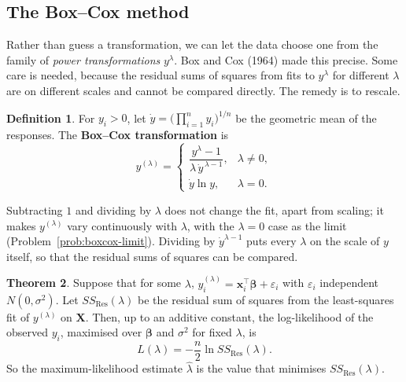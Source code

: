 \documentclass[11pt,a4paper]{article}
\numberwithin{equation}{section}
\theoremstyle{definition}
\newtheorem{thm}{Theorem}[subsection]
\newtheorem{defn}[thm]{Definition}
\begin{document}
\subsection{The Box--Cox method}
Rather than guess a transformation, we can let the data choose one from the family of
\emph{power transformations} $y^\lambda$. Box and Cox (1964) made this precise. Some care is
needed, because the residual sums of squares from fits to $y^\lambda$ for different $\lambda$ are
on different scales and cannot be compared directly. The remedy is to rescale.

\begin{defn}
For $y_i > 0$, let $\dot y = \bigl(\prod_{i=1}^n y_i\bigr)^{1/n}$ be the geometric mean of the
responses. The \textbf{Box--Cox transformation} is
\[
y^{(\lambda)} = \begin{cases}
\dfrac{y^\lambda - 1}{\lambda\,\dot y^{\,\lambda - 1}} , & \lambda \neq 0, \\[3mm]
\dot y\ln y , & \lambda = 0 .
\end{cases}
\]
\end{defn}

Subtracting $1$ and dividing by $\lambda$ does not change the fit, apart from scaling; it makes
$y^{(\lambda)}$ vary continuously with $\lambda$, with the $\lambda = 0$ case as the limit
(Problem~\ref{prob:boxcox-limit}). Dividing by $\dot y^{\lambda - 1}$ puts every $\lambda$ on the
scale of $y$ itself, so that the residual sums of squares can be compared.

\begin{thm}\label{thm:boxcox}
Suppose that for some $\lambda$, $y_i^{(\lambda)} = \mathbf{x}_i^\top\boldsymbol\beta + \varepsilon_i$ with
$\varepsilon_i$ independent $N(0, \sigma^2)$. Let $SS_{\mathrm{Res}}(\lambda)$ be the residual sum of
squares from the least-squares fit of $y^{(\lambda)}$ on $\mathbf{X}$. Then, up to an additive
constant, the log-likelihood of the observed $y_i$, maximised over $\boldsymbol\beta$ and $\sigma^2$
for fixed $\lambda$, is
\[
L(\lambda) = -\frac{n}{2}\ln SS_{\mathrm{Res}}(\lambda) .
\]
So the maximum-likelihood estimate $\hat\lambda$ is the value that minimises $SS_{\mathrm{Res}}(\lambda)$.
\end{thm}
\end{document}
